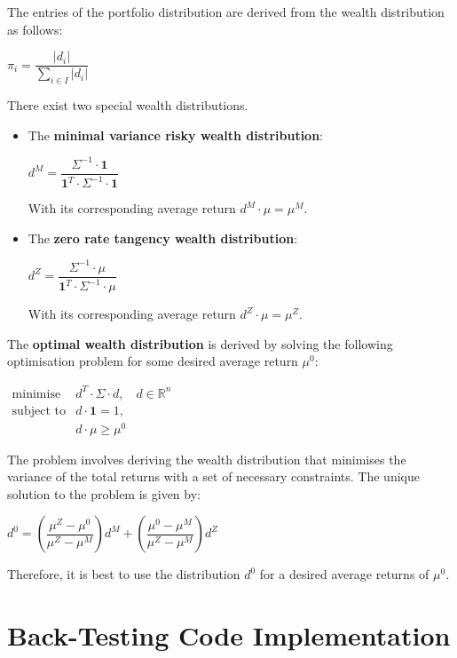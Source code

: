 \documentclass[11pt]{article}
\begin{document}
The entries of the portfolio distribution are derived from the wealth distribution as follows:
\begin{center}
    $\pi_i = \dfrac{|d_i|}{\sum_{i \in I}|d_i|}$
\end{center}

There exist two special wealth distributions.
\begin{itemize}
    \item The \textbf{minimal variance risky wealth distribution}:
    \begin{center}
        $d^{M} = \dfrac{\Sigma^{-1} \cdot \mathbf{1}}{\mathbf{1}^{T} \cdot \Sigma^{-1} \cdot \mathbf{1}}$
    \end{center}
    With its corresponding average return $d^{M} \cdot \mu= \mu^{M}$.
    \item The \textbf{zero rate tangency wealth distribution}:
    \begin{center}
        $d^{Z} = \dfrac{\Sigma^{-1} \cdot \mu}{\mathbf{1}^{T} \cdot \Sigma^{-1} \cdot \mu}$
    \end{center}
    With its corresponding average return $d^{Z} \cdot \mu= \mu^{Z}$.
\end{itemize}


The \textbf{optimal wealth distribution} is derived by solving the following optimisation problem for some desired average return $\mu^{0}$:
\begin{center}
        $\begin{matrix}
\text{minimise} & d^T \cdot \Sigma \cdot d, & d \in \mathbb{R}^{n} \\
\text{subject to} & d \cdot \mathbf{1}=1, & \\ 
 & d \cdot \mu \geq \mu^{0} & 
\end{matrix}$
    \end{center}

The problem involves deriving the wealth distribution that minimises the variance of the total returns with a set of necessary constraints. The unique solution to the problem is given by:
\begin{center}
    $d^{0}= \left (\dfrac{\mu^{Z} - \mu^{0}}{\mu^{Z} - \mu^{M}} \right ) d^{M} + \left (\dfrac{\mu^{0} - \mu^{M}}{\mu^{Z} - \mu^{M}} \right ) d^{Z}$
\end{center}

Therefore, it is best to use the distribution $d^{0}$ for a desired average returns of $\mu^{0}$.

\section{Back-Testing Code Implementation}
\end{document}
